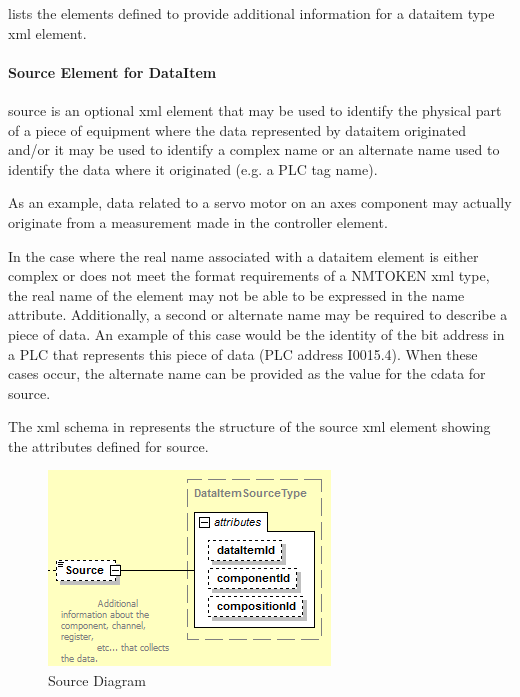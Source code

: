  lists the elements defined to provide additional information for a \gls{dataitem} type \gls{xml} element.



\paragraph{Source Element for DataItem}\mbox{}

\gls{source} is an optional \gls{xml} element that may be used to identify the physical part of a piece of equipment where the data represented by \gls{dataitem} originated and/or it may be used to identify a complex name or an alternate name used to identify the data where it originated (e.g. a PLC tag name).


As an example, data related to a servo motor on an \gls{axes} component may actually originate from a measurement made in the \gls{controller} element.

In the case where the real name associated with a \gls{dataitem} element is either complex or does not meet the format requirements of a NMTOKEN \gls{xml} type, the real name of the element may not be able to be expressed in the \gls{name} attribute. Additionally, a second or alternate name may be required to describe a piece of data. An example of this case would be the identity of the bit address in a PLC that represents this piece of data (PLC address I0015.4). When these cases occur, the alternate name can be provided as the value for the \gls{cdata} for \gls{source}.

The \gls{xml} schema in  represents the structure of the \gls{source} \gls{xml} element showing the attributes defined for \gls{source}.

\begin{figure}[ht]
  \centering
  \includegraphics[width=.5\textwidth]{figures/source-schema-diagram.png}
  \caption{Source Diagram}
  \label{fig:source-schema-diagram}
\end{figure}
\FloatBarrier

